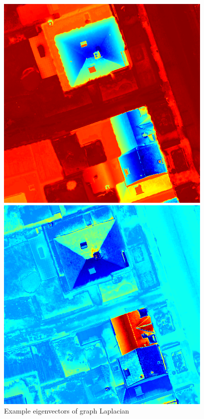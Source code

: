 \documentclass{beamer}
\begin{document}
\begin{frame}
\begin{figure}[ht]
\begin{minipage}[b]{0.3\linewidth}
      \includegraphics[width=\textwidth]{./Images/DFC2015/evec2.png}
    \end{minipage}
    \begin{minipage}[b]{0.3\linewidth}
      \centering
      \includegraphics[width=\textwidth]{./Images/DFC2015/evec4.png}
    \end{minipage}
    \caption{Example eigenvectors of graph Laplacian}
  \end{figure}
\end{frame}
\end{document}
